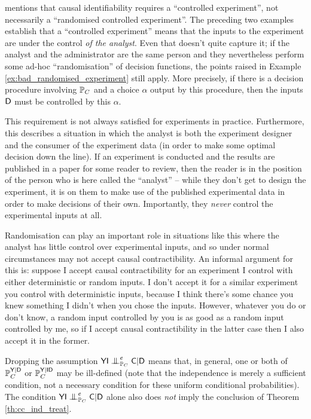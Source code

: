 \citet{kasy_why_2016} mentions that causal identifiability requires a ``controlled experiment'', not necessarily a ``randomised controlled experiment''. The preceding two examples establish that a ``controlled experiment'' means that the inputs to the experiment are under the control \emph{of the analyst}. Even that doesn't quite capture it; if the analyst and the administrator are the same person and they nevertheless perform some ad-hoc ``randomisation'' of decision functions, the points raised in Example \ref{ex:bad_randomised_experiment} still apply. More precisely, if there is a decision procedure involving $\mathbb{P}_C$ and a choice $\alpha$ output by this procedure, then the inputs $\mathsf{D}$ must be controlled by this $\alpha$. 

This requirement is not always satisfied for experiments in practice. Furthermore, this describes a situation in which the analyst is both the experiment designer and the consumer of the experiment data (in order to make some optimal decision down the line). If an experiment is conducted and the results are published in a paper for some reader to review, then the reader is in the position of the person who is here called the ``analyst'' -- while they don't get to design the experiment, it is on them to make use of the published experimental data in order to make decisions of their own. Importantly, they \emph{never} control the experimental inputs at all.

Randomisation can play an important role in situations like this where the analyst has little control over experimental inputs, and so under normal circumstances may not accept causal contractibility. An informal argument for this is: suppose I accept causal contractibility for an experiment I control with either deterministic or random inputs. I don't accept it for a similar experiment you control with deterministic inputs, because I think there's some chance you knew something I didn't when you chose the inputs. However, whatever you do or don't know, a random input controlled by you is as good as a random input controlled by me, so if I accept causal contractibility in the latter case then I also accept it in the former.

Dropping the assumption $\RV{YI}\CI^e_{\prob{P}_C} \RV{C}|\RV{D}$ means that, in general, one or both of $\mathbb{P}_C^{\mathsf{Y}|\mathsf{D}}$ or $\mathbb{P}_C^{\mathsf{Y}|\mathsf{ID}}$ may be ill-defined (note that the independence is merely a sufficient condition, not a necessary condition for these uniform conditional probabilities). The condition $\RV{YI}\CI^e_{\prob{P}_C} \RV{C}|\RV{D}$ alone also does \emph{not} imply the conclusion of Theorem \ref{th:cc_ind_treat}. 

